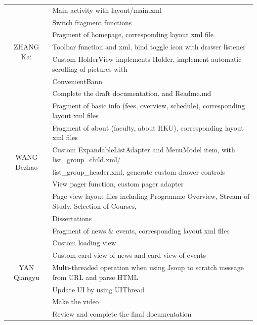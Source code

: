 \documentclass{article}
\begin{document}
    \begin{table}[h]
        \centering
        \begin{tabular}{|c|l|}
            \hline
            \multirow{7}{*}{ZHANG Kai} &  Main activity with layout/main.xml\\
            \cline{2-2}
            &Switch fragment functions \\
            \cline{2-2}
            &Fragment of homepage, corresponding layout xml file \\
            \cline{2-2}
            &Toolbar function and xml, bind toggle icon with drawer listener \\
            \cline{2-2}
            & Custom HolderView implements Holder, 
            implement automatic scrolling of pictures with\\
            & ConvenientBann\\
            \cline{2-2}
            &Complete the draft documentation, and Readme.md \\
            \hline
            \multirow{7}{*}{WANG Dezhao} &  
            Fragment of basic info (fees, overview, schedule), 
            corresponding layout xml files\\
            \cline{2-2}
            & Fragment of about (faculty, about HKU), 
            corresponding layout xml files \\
            \cline{2-2}
            & Custom ExpandableListAdapter and MenuModel item, 
            with list\_group\_child.xml/ \\
            & list\_group\_header.xml,
             generate custom drawer controls \\
            \cline{2-2}
            & View pager function, custom pager adapter \\
            \cline{2-2}
            & Page view layout files including Programme Overview, 
            Stream of Study, Selection of Courses, \\
            & Dissertations \\
            \hline
            \multirow{7}{*}{YAN Qiangyu} &  
            Fragment of news \& events, corresponding layout xml files\\
            \cline{2-2}
            & Custom loading view \\
            \cline{2-2}
            & Custom card view of news and card view of events \\
            \cline{2-2}
            & Multi-threaded operation when using Jsoup 
            to scratch message from URL and parse HTML \\
            \cline{2-2}
            & Update UI by using UIThread \\
            \cline{2-2}
            & Make the video \\
            \cline{2-2}
            & Review and complete the final documentation \\
            \hline
        \end{tabular}
    \end{table}

    
\end{document}
